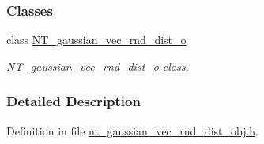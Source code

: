 \subsubsection*{Classes}
\begin{DoxyCompactItemize}
\item 
class \hyperlink{class_n_t__gaussian__vec__rnd__dist__o}{NT\_\-gaussian\_\-vec\_\-rnd\_\-dist\_\-o}
\begin{DoxyCompactList}\small\item\em \hyperlink{class_n_t__gaussian__vec__rnd__dist__o}{NT\_\-gaussian\_\-vec\_\-rnd\_\-dist\_\-o} class. \item\end{DoxyCompactList}\end{DoxyCompactItemize}


\subsubsection{Detailed Description}


Definition in file \hyperlink{nt__gaussian__vec__rnd__dist__obj_8h_source}{nt\_\-gaussian\_\-vec\_\-rnd\_\-dist\_\-obj.h}.

